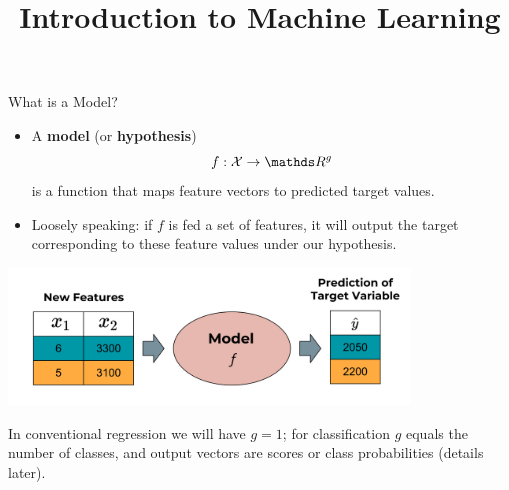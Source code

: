 \documentclass[11pt,compress,t,notes=noshow, xcolor=table]{beamer}
\title{Introduction to Machine Learning}
\institute{\href{https://compstat-lmu.github.io/lecture_i2ml/}{compstat-lmu.github.io/lecture\_i2ml}}
\date{}
\begin{document}










\begin{vbframe}{What is a Model?}

\begin{itemize}

  \item A \textbf{model} (or \textbf{hypothesis}) 
  $$f : \Xspace \rightarrow \R^g$$ 
  is a function that maps feature vectors to predicted target values.
  
  \item Loosely speaking: if $f$ is fed a set of features, it will output the 
  target corresponding to these feature values under our hypothesis.
  
\end{itemize}

\begin{center}
  \includegraphics[width = 0.8\textwidth]{figure_man/the_model_web} 
\end{center}
  
{\footnotesize In conventional regression we will have $g = 1$; for 
classification $g$ equals the number of classes, and output vectors are scores 
or class probabilities (details later).}

\framebreak


\end{vbframe}
\end{document}
